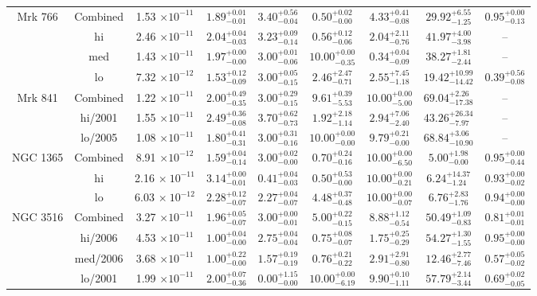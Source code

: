 \documentclass{article}
\begin{document}
\begin{landscape}
\begin{longtable}{ccccccccc}
Mrk 766 & Combined & 1.53 $\times 10^{-11}$ & $1.89^{+0.01}_{-0.01}$ & $3.40^{+0.56}_{-0.04}$ & $0.50^{+0.02}_{-0.00}$ & $4.33^{+0.41}_{-0.08}$ & $29.92^{+6.55}_{-1.25}$ &  $0.95^{+0.00}_{-0.13}$\\ 
& hi & 2.46 $\times 10^{-11}$ & $2.04^{+0.04}_{-0.03}$ & $3.23^{+0.09}_{-0.14}$ & $0.56^{+0.12}_{-0.06}$ & $2.04^{+2.11}_{-0.76}$ & $41.97^{+4.00}_{-3.98}$ & -- \\ 
& med & 1.43 $\times 10^{-11}$ & $1.97^{+0.00}_{-0.00}$ & $3.00^{+0.01}_{-0.06}$ & $10.00^{+0.00}_{-0.35}$ & $0.34^{+0.04}_{-0.09}$ & $38.27^{+1.81}_{-2.44}$ & -- \\ 
& lo & 7.32 $\times 10^{-12}$ & $1.53^{+0.12}_{-0.09}$ & $3.00^{+0.05}_{-0.15}$ & $2.46^{+2.47}_{-0.71}$ & $2.55^{+7.45}_{-1.18}$ & $19.42^{+10.99}_{-14.42}$ &  $0.39^{+0.56}_{-0.08}$ \\ \hline 

Mrk 841 & Combined & 1.22 $\times 10^{-11}$ & $2.00^{+0.49}_{-0.35}$ & $3.00^{+0.29}_{-0.15}$ & $9.61^{+0.39}_{-5.53}$ & $10.00^{+0.00}_{-5.00}$ & $69.04^{+2.26}_{-17.38}$ & --\\
& hi/2001 & 1.55 $\times 10^{-11}$ & $2.49^{+0.36}_{-0.08}$ & $3.70^{+0.62}_{-0.73}$ & $1.92^{+2.18}_{-1.14}$ & $2.94^{+7.06}_{-2.40}$ & $43.26^{+26.34}_{-7.97}$ & --\\ 
& lo/2005  & 1.08 $\times 10^{-11}$ & $1.80^{+0.41}_{-0.31}$ & $3.00^{+0.31}_{-0.16}$ & $10.00^{+0.00}_{-0.00}$ & $9.79^{+0.21}_{-0.00}$ & $68.84^{+3.06}_{-10.90}$ & --\\ \hline   
NGC 1365 & Combined & 8.91 $\times 10^{-12}$ & $1.59^{+0.04}_{-0.14}$ & $3.00^{+0.02}_{-0.00}$ & $0.70^{+0.24}_{-0.16}$ & $10.00^{+0.00}_{-6.50}$ & $5.00^{+1.98}_{-0.00}$ & $0.95^{+0.00}_{-0.44}$\\ 
& hi & 2.16 $\times~10^{-11}$ & $3.14^{+0.00}_{-0.01}$ & $0.41^{+0.04}_{-0.03}$ & $0.50^{+0.53}_{-0.00}$ & $10.00^{+0.00}_{-0.21}$ & $6.24^{+14.37}_{-1.24}$ & $0.93^{+0.00}_{-0.02}$ \\
& lo & 6.03 $\times~10^{-12}$ & $2.28^{+0.12}_{-0.07}$ & $2.27^{+0.04}_{-0.07}$ & $4.48^{+0.37}_{-0.48}$ & $10.00^{+0.00}_{-0.07}$ & $6.76^{+2.83}_{-1.76}$ & $0.94^{+0.00}_{-0.00}$ \\ \hline 

NGC 3516 & Combined & 3.27 $\times 10^{-11}$ & $1.96^{+0.05}_{-0.07}$ & $3.00^{+0.00}_{-0.01}$ & $5.00^{+0.22}_{-0.15}$ & $8.88^{+1.12}_{-0.54}$ & $50.49^{+1.09}_{-0.83}$ & $0.81^{+0.01}_{-0.01}$\\ 
& hi/2006 & 4.53 $\times 10^{-11}$ & $1.00^{+0.04}_{-0.00}$ & $2.75^{+0.04}_{-0.04}$ & $0.75^{+0.08}_{-0.07}$ & $1.75^{+0.25}_{-0.29}$ & $54.27^{+1.30}_{-1.55}$ & $0.95^{+0.00}_{-0.00}$\\ 
& med/2006 & 3.68 $\times 10^{-11}$ & $1.00^{+0.22}_{-0.00}$ & $1.57^{+0.19}_{-0.19}$ & $0.76^{+0.21}_{-0.22}$ & $2.91^{+2.91}_{-0.80}$ & $12.46^{+2.77}_{-7.46}$ & $0.57^{+0.05}_{-0.02}$\\ 
& lo/2001 & 1.99 $\times 10^{-11}$ & $2.00^{+0.07}_{-0.36}$ & $0.00^{+1.15}_{-0.00}$ & $10.00^{+0.00}_{-6.19}$ & $9.90^{+0.10}_{-1.11}$ & $57.79^{+2.14}_{-3.44}$ & $0.69^{+0.02}_{-0.05}$\\  \hline 


\end{longtable}
\end{landscape}
\end{document}
